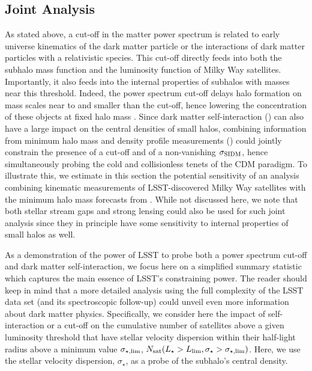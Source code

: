 \subsection{Joint Analysis   }
\label{sec:combine_probes} 
 
As stated above, a cut-off in the matter power spectrum is related to early universe kinematics of the dark matter particle or the interactions of dark matter particles with a relativistic species. This cut-off directly feeds into both the subhalo mass function and the luminosity function of Milky Way satellites. Importantly, it also feeds into the internal properties of subhalos with masses near this threshold. Indeed, the power spectrum cut-off delays halo formation on mass scales near to and smaller than the cut-off, hence lowering the concentration of these objects at fixed halo mass \citep[\eg,][]{Dunstan:2011bq}. Since dark matter self-interaction () can also have a large impact on the central densities of small halos, combining information from minimum halo mass and density profile measurements () could jointly constrain the presence of a cut-off and of a non-vanishing $\sigma_{\rm SIDM}$, hence simultaneously probing the cold and collisionless tenets of the CDM paradigm. To illustrate this, we estimate in this section the potential sensitivity of an analysis combining kinematic measurements of LSST-discovered Milky Way satellites with the minimum halo mass forecasts from . While not discussed here, we note that both stellar stream gaps and strong lensing could also be used for such joint analysis since they in principle have some sensitivity to internal properties of small halos as well. 

\vspace{1em} 

As a demonstration of the power of LSST to probe both a power spectrum cut-off and dark matter self-interaction, we focus here on a simplified summary statistic which captures the main essence of LSST's constraining power. The reader should keep in mind that a more detailed analysis using the full complexity of the LSST data set (and its spectroscopic follow-up) could unveil even more information about dark matter physics. Specifically, we consider here the impact of self-interaction or a cut-off on the cumulative number of satellites above a given luminosity threshold that have stellar velocity dispersion within their half-light radius above a minimum value $\sigma_{\star,\rm lim}$, $N_{\rm sat}(L_\star>L_{\rm lim}, \sigma_\star> \sigma_{\star,\rm lim})$. Here, we use the stellar velocity dispersion, $\sigma_\star$, as a probe of the subhalo's central density.

